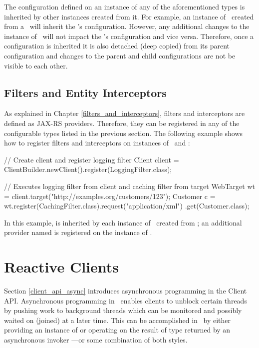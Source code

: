 The configuration defined on an instance of any of the aforementioned types is inherited by other instances created from it. For example, an instance of \WebTarget\ created from a \Client\ will inherit the \Client's configuration. However, any additional changes to the instance of \WebTarget\ will not impact the \Client's configuration and vice versa. Therefore, once a configuration is inherited it is also detached (deep copied) from its parent configuration and changes to the parent and child configurations are not be visible to each other.

\subsection{Filters and Entity Interceptors}
\label{filters_interceptors_client}

As explained in Chapter \ref{filters_and_interceptors}, filters and interceptors are defined as JAX-RS providers. Therefore, they can be registered in any of the configurable types listed in the previous section. The following example shows how to register filters and interceptors on instances of \Client\ and \WebTarget:

\begin{listing}{1}
// Create client and register logging filter
Client client = ClientBuilder.newClient().register(LoggingFilter.class);

// Executes logging filter from client and caching filter from target
WebTarget wt = client.target("http://examples.org/customers/123");
Customer c = wt.register(CachingFilter.class).request("application/xml")
    .get(Customer.class);
\end{listing}

In this example,  is inherited by each instance of \WebTarget\ created from ; an additional provider named  is registered on the instance of \WebTarget.

\section{Reactive Clients}
\label{reactive_clients}

Section \ref{client_api_async} introduces asynchronous programming in the Client API. Asynchronous programming in \jaxrs\ enables clients to unblock certain threads by pushing work to background threads which can be monitored and possibly waited on (joined) at a later time. This can be accomplished in \jaxrs\ by either providing an instance of  or operating on the result of type  returned by an asynchronous invoker ---or some combination of both styles. 


